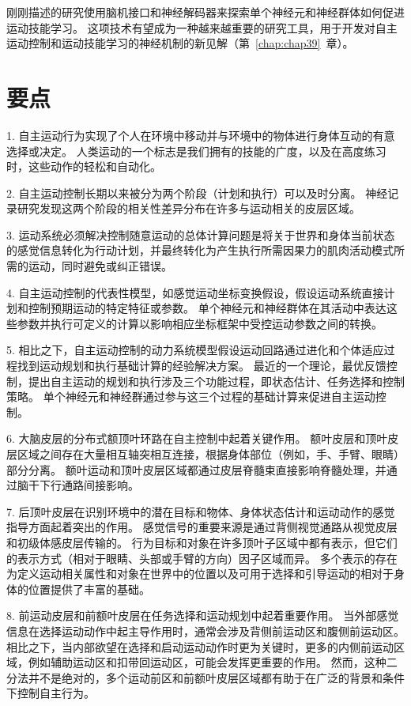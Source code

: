 刚刚描述的研究使用脑机接口和神经解码器来探索单个神经元和神经群体如何促进运动技能学习。
这项技术有望成为一种越来越重要的研究工具，用于开发对自主运动控制和运动技能学习的神经机制的新见解（第~\ref{chap:chap39}~章）。



\section{要点}

1. 自主运动行为实现了个人在环境中移动并与环境中的物体进行身体互动的有意选择或决定。
人类运动的一个标志是我们拥有的技能的广度，以及在高度练习时，这些动作的轻松和自动化。


2. 自主运动控制长期以来被分为两个阶段（计划和执行）可以及时分离。
神经记录研究发现这两个阶段的相关性差异分布在许多与运动相关的皮层区域。


3. 运动系统必须解决控制随意运动的总体计算问题是将关于世界和身体当前状态的感觉信息转化为行动计划，并最终转化为产生执行所需因果力的肌肉活动模式所需的运动，同时避免或纠正错误。


4. 自主运动控制的代表性模型，如感觉运动坐标变换假设，假设运动系统直接计划和控制预期运动的特定特征或参数。
单个神经元和神经群体在其活动中表达这些参数并执行可定义的计算以影响相应坐标框架中受控运动参数之间的转换。


5. 相比之下，自主运动控制的动力系统模型假设运动回路通过进化和个体适应过程找到运动规划和执行基础计算的经验解决方案。
最近的一个理论，最优反馈控制，提出自主运动的规划和执行涉及三个功能过程，即状态估计、任务选择和控制策略。
单个神经元和神经群通过参与这三个过程的基础计算来促进自主运动控制。


6. 大脑皮层的分布式额顶叶环路在自主控制中起着关键作用。
额叶皮层和顶叶皮层区域之间存在大量相互轴突相互连接，根据身体部位（例如，手、手臂、眼睛）部分分离。
额叶运动和顶叶皮层区域都通过皮层脊髓束直接影响脊髓处理，并通过脑干下行通路间接影响。


7. 后顶叶皮层在识别环境中的潜在目标和物体、身体状态估计和运动动作的感觉指导方面起着突出的作用。
感觉信号的重要来源是通过背侧视觉通路从视觉皮层和初级体感皮层传输的。
行为目标和对象在许多顶叶子区域中都有表示，但它们的表示方式（相对于眼睛、头部或手臂的方向）因子区域而异。
多个表示的存在为定义运动相关属性和对象在世界中的位置以及可用于选择和引导运动的相对于身体的位置提供了丰富的基础。


8. 前运动皮层和前额叶皮层在任务选择和运动规划中起着重要作用。
当外部感觉信息在选择运动动作中起主导作用时，通常会涉及背侧前运动区和腹侧前运动区。
相比之下，当内部欲望在选择和启动运动动作时更为关键时，更多的内侧前运动区域，例如辅助运动区和扣带回运动区，可能会发挥更重要的作用。
然而，这种二分法并不是绝对的，多个运动前区和前额叶皮层区域都有助于在广泛的背景和条件下控制自主行为。


